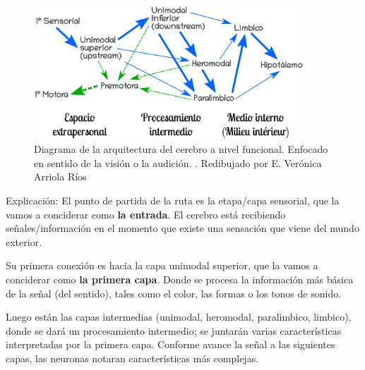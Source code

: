  \begin{figure}[h]
  \centering
  \includegraphics[width=0.9\textwidth]{../Figuras/zonasFuncionales.png}
  \caption{Diagrama de la arquitectura del cerebro a nivel funcional. Enfocado en sentido de la visión o la audición. \parencite{Mesulam1998}. Redibujado por E. Verónica Arriola Ríos}
  \label{fig:zonasFun}
 \end{figure}

Explicación: El punto de partida de la ruta es la etapa/capa sensorial, que la vamos a conciderar como \textbf{la entrada}. El cerebro está recibiendo señales/información en el momento que existe una sensación que viene del mundo exterior.

Su primera conexión es hacia la capa unimodal superior, que la vamos a conciderar como \textbf{la primera capa}. Donde se procesa la información más básica de la señal (del sentido), tales como el color, las formas o los tonos de sonido.

Luego están las capas intermedias (unimodal, heromodal, paralimbico, limbico), donde se dará un procesamiento intermedio; se juntarán varias características interpretadas por la primera capa. Conforme avance la señal a las siguientes capas, las neuronas notaran características más complejas. 




